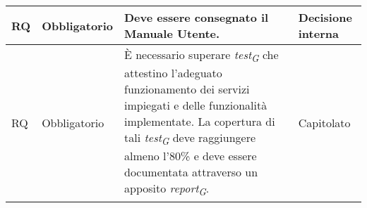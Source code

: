 \begin{longtable}{|C{1.5cm}|C{2cm}|L{5cm}|C{2cm}|}
   
    \hline
     RQ & Obbligatorio & Deve essere consegnato il Manuale Utente. & Decisione interna \\

    \hline
     RQ & Obbligatorio & È necessario superare \textit{test}\textsubscript{\textit{G}} che attestino l'adeguato funzionamento dei servizi impiegati e delle funzionalità implementate. La copertura di tali \textit{test}\textsubscript{\textit{G}} deve raggiungere almeno l'80\% e deve essere documentata attraverso un apposito \textit{report}\textsubscript{\textit{G}}. & Capitolato \\

    \hline
   
\end{longtable}